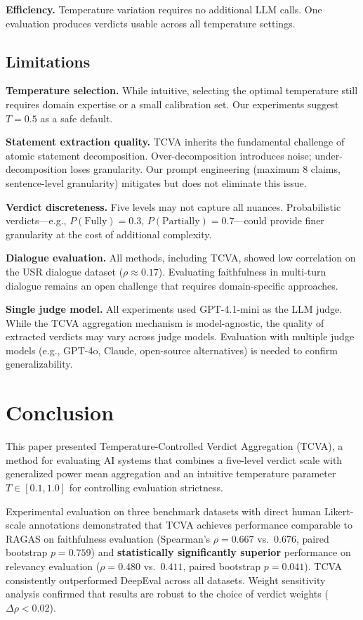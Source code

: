 \documentclass[sn-basic]{sn-jnl}
\theoremstyle{thmstyleone}%
\theoremstyle{thmstyletwo}%
\theoremstyle{thmstylethree}%
\begin{document}
\textbf{Efficiency.} Temperature variation requires no additional LLM calls. One evaluation produces verdicts usable across all temperature settings.

\subsection{Limitations}

\textbf{Temperature selection.} While intuitive, selecting the optimal temperature still requires domain expertise or a small calibration set. Our experiments suggest $T = 0.5$ as a safe default.

\textbf{Statement extraction quality.} TCVA inherits the fundamental challenge of atomic statement decomposition. Over-decomposition introduces noise; under-decomposition loses granularity. Our prompt engineering (maximum 8 claims, sentence-level granularity) mitigates but does not eliminate this issue.

\textbf{Verdict discreteness.} Five levels may not capture all nuances. Probabilistic verdicts---e.g., $P(\text{Fully}) = 0.3$, $P(\text{Partially}) = 0.7$---could provide finer granularity at the cost of additional complexity.

\textbf{Dialogue evaluation.} All methods, including TCVA, showed low correlation on the USR dialogue dataset ($\rho \approx 0.17$). Evaluating faithfulness in multi-turn dialogue remains an open challenge that requires domain-specific approaches.

\textbf{Single judge model.} All experiments used GPT-4.1-mini as the LLM judge. While the TCVA aggregation mechanism is model-agnostic, the quality of extracted verdicts may vary across judge models. Evaluation with multiple judge models (e.g., GPT-4o, Claude, open-source alternatives) is needed to confirm generalizability.

\section{Conclusion}

This paper presented Temperature-Controlled Verdict Aggregation (TCVA), a method for evaluating AI systems that combines a five-level verdict scale with generalized power mean aggregation and an intuitive temperature parameter $T \in [0.1, 1.0]$ for controlling evaluation strictness.

Experimental evaluation on three benchmark datasets with direct human Likert-scale annotations demonstrated that TCVA achieves performance comparable to RAGAS on faithfulness evaluation (Spearman's $\rho = 0.667$ vs.\ $0.676$, paired bootstrap $p = 0.759$) and \textbf{statistically significantly superior} performance on relevancy evaluation ($\rho = 0.480$ vs.\ $0.411$, paired bootstrap $p = 0.041$). TCVA consistently outperformed DeepEval across all datasets. Weight sensitivity analysis confirmed that results are robust to the choice of verdict weights ($\Delta\rho < 0.02$).
\end{document}
